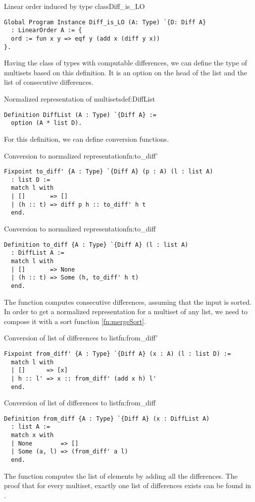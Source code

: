 \begin{defi}{Linear order induced by  type class}{Diff_is_LO}
\begin{verbatim}
Global Program Instance Diff_is_LO (A: Type) `{D: Diff A} 
  : LinearOrder A := {
  ord := fun x y => eqf y (add x (diff y x))
}.
\end{verbatim}
\end{defi}

Having the class of types with computable differences, we can define the type of multisets based on this definition. It is an option on the head of the list and the list of consecutive differences.
\begin{defi}{Normalized representation of multisets}{def:DiffList}
\begin{verbatim}
Definition DiffList (A : Type) `{Diff A} :=
  option (A * list D).
\end{verbatim}
\end{defi}
For this definition, we can define conversion functions.
\begin{func}{Conversion to normalized representation}{fn:to_diff'}
\begin{verbatim}
Fixpoint to_diff' {A : Type} `{Diff A} (p : A) (l : list A) 
  : list D :=
  match l with
  | []       => []
  | (h :: t) => diff p h :: to_diff' h t
  end.
\end{verbatim}
\end{func}
\begin{func}{Conversion to normalized representation}{fn:to_diff}
\begin{verbatim}
Definition to_diff {A : Type} `{Diff A} (l : list A) 
  : DiffList A :=
  match l with
  | []       => None
  | (h :: t) => Some (h, to_diff' h t)
  end.
\end{verbatim}
\end{func}
The function  computes consecutive differences, assuming that the input is sorted. In order to get a normalized representation for a multiset of any list, we need to compose it with a sort function \ref{fn:mergeSort}.
\begin{func}{Conversion of list of differences to list}{fn:from_diff'}
\begin{verbatim}
Fixpoint from_diff' {A : Type} `{Diff A} (x : A) (l : list D) :=
  match l with
  | []      => [x]
  | h :: l' => x :: from_diff' (add x h) l'
  end.
\end{verbatim}
\end{func}
\begin{func}{Conversion of list of differences to list}{fn:from_diff}
\begin{verbatim}
Definition from_diff {A : Type} `{Diff A} (x : DiffList A) 
  : list A :=
  match x with
  | None        => []
  | Some (a, l) => (from_diff' a l)
  end.
\end{verbatim}
\end{func}
The function  computes the list of elements by adding all the differences. The proof that for every multiset, exactly one list of differences exists can be found in .
